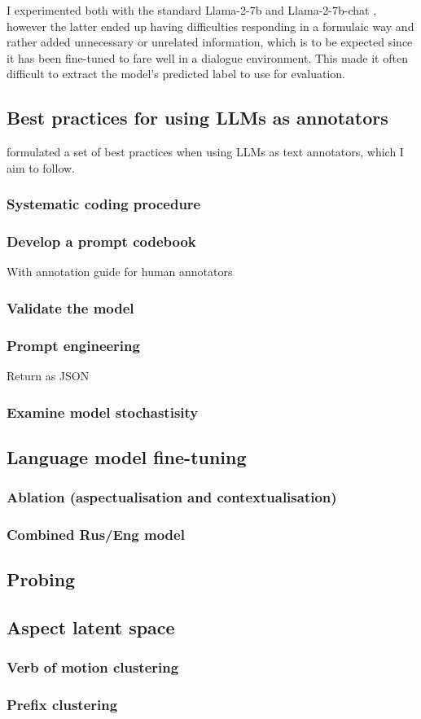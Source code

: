 I experimented both with the standard \textsf{Llama-2-7b} and \textsf{Llama-2-7b-chat} \citep{touvron2023llama}, however the latter ended up having difficulties responding in a formulaic way and rather added unnecessary or unrelated information, which is to be expected since it has been fine-tuned to fare well in a dialogue environment. This made it often difficult to extract the model's predicted label to use for evaluation. 

\subsection*{Best practices for using LLMs as annotators}
\citet{törnberg2024best} formulated a set of best practices when using LLMs as text annotators, which I aim to follow.

\subsubsection*{Systematic coding procedure}
\subsubsection*{Develop a prompt codebook}
With annotation guide for human annotators
\subsubsection*{Validate the model}
\subsubsection*{Prompt engineering}
Return as JSON
\subsubsection*{Examine model stochastisity}


\subsection{Language model fine-tuning}
\subsubsection{Ablation (aspectualisation and contextualisation)}
\subsubsection{Combined Rus/Eng model}
\subsection{Probing}
\subsection{Aspect latent space}
\subsubsection{Verb of motion clustering}
\subsubsection{Prefix clustering}